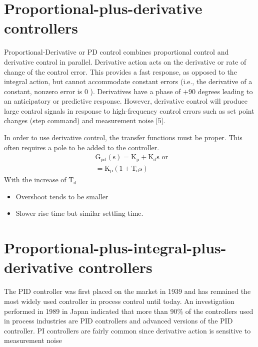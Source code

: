 \section{Proportional-plus-derivative controllers}

Proportional-Derivative or PD control combines proportional control and derivative control in parallel. Derivative action acts on the derivative or rate of change of the control error. This provides a fast response, as opposed to the integral action, but cannot accommodate constant errors (i.e., the derivative of a constant, nonzero error is 0 ). Derivatives have a phase of $+90$ degrees leading to an anticipatory or predictive response. However, derivative control will produce large control signals in response to high-frequency control errors such as set point changes (step command) and measurement noise [5].

In order to use derivative control, the transfer functions must be proper. This often requires a pole to be added to the controller.
$$
\begin{aligned}
&\mathrm{G}_{\mathrm{pd}}(\mathrm{s})=\mathrm{K}_{\mathrm{p}}+\mathrm{K}_{\mathrm{d}} \mathrm{s} \text { or } \\
&=\mathrm{K}_{\mathrm{p}}\left(1+\mathrm{T}_{\mathrm{d}} \mathrm{s}\right)
\end{aligned}
$$
With the increase of $\mathrm{T}_{\mathrm{d}}$
\begin{itemize}
	\item Overshoot tends to be smaller
	\item Slower rise time but similar settling time.
\end{itemize}

\section{Proportional-plus-integral-plus-derivative controllers}

The PID controller was first placed on the market in 1939 and has remained the most widely used controller in process control until today. An investigation performed in 1989 in Japan indicated that more than 90\% of the controllers used in process industries are PID controllers and advanced versions of the PID controller. PI controllers are fairly common since derivative action is sensitive to measurement noise 

